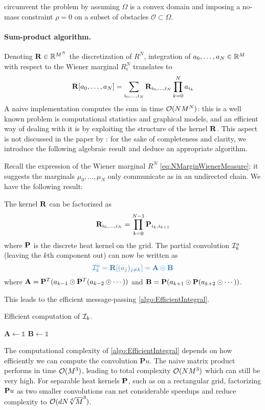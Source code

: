 \documentclass[../report.tex]{subfiles}
\begin{document}
\textcite{benamou:hal-01295299} circumvent the problem by assuming $\Omega$ is a convex domain and imposing a no-mass constraint $\rho = 0$ on a subset of obstacles $\mathscr{O} \subset \Omega$.

\paragraph{Sum-product algorithm.} Denoting $\mathbf{R} \in \mathbb{R}^{M^N}$ the discretization of $R^N$, integration of $a_0,\ldots,a_N\in\mathbb{R}^M$ with respect to the Wiener marginal $R^N_\epsilon$ translates to
\[
	\mathbf{R}[a_0, \ldots, a_N] =
	\sum_{i_0,\ldots,i_N} \mathbf{R}_{i_0,\ldots,i_N}\prod_{k=0}^N a_{i_k}
\]
A naive implementation computes the sum in time $\mathcal{O}(NM^N)$: this is a well known problem is computational statistics and graphical models, and an efficient way of dealing with it is by exploiting the structure of the kernel $\mathbf{R}$. This aspect is not discussed in the paper by \textcite{benamou:hal-01295299}: for the sake of completeness and clarity, we introduce the following algebraic result and deduce an appropriate algorithm.

Recall the expression of the Wiener marginal $R^N$ \cref{eq:NMarginWienerMeasure}: it suggests the marginals $\mu_0,\ldots,\mu_N$ only communicate as in an undirected chain. We have the following result:
\begin{prop}\label{prop:efficientConvol}
	The kernel $\mathbf{R}$ can be factorized as 
	\[
		\mathbf{R}_{i_0,\ldots,i_N} = \prod_{k=0}^{N-1} \mathbf{P}_{i_k,i_{k+1}}
	\]
	where $\mathbf{P}$ is the discrete heat kernel on the grid. The partial convolution $\mathcal{I}^a_k$ (leaving the $k$th component out) can now be written as
	\begin{equation}
	{\bluefont
		\calI_k^a = \bfR[(a_j)_{j\neq k}] =
		\mathbf{A} \odot \mathbf{B}
	}
	\end{equation}
	where $\mathbf{A} = \mathbf{P}^T (a_{k-1} \odot \mathbf{P}^T(a_{k-2} \odot \cdots))$ and $\mathbf{B} = \mathbf{P} (a_{k+1} \odot \mathbf{P} (a_{k+2}\odot \cdots))$.
\end{prop} This leads to the efficient message-passing \cref{algo:EfficientIntegral}.
\begin{algorithm}[h]
\caption{Efficient computation of $\mathcal{I}_k$.}\label{algo:EfficientIntegral}
$\mathbf{A} \leftarrow \mathds{1}$\;
$\mathbf{B} \leftarrow \mathds{1}$\;
\;
\end{algorithm}

The computational complexity of \cref{algo:EfficientIntegral} depends on how efficiently we can compute the convolution $\mathbf{P}u$. The naive matrix product performs in time $\mathcal{O}(M^3)$, leading to total complexity $\mathcal{O}(NM^3)$ which can still be very high. For separable heat kernels $\mathbf{P}$, such as on a rectangular grid, factorizing $\mathbf{P} u$ as two smaller convolutions can net considerable speedups \parencite[see][p.~74]{peyr2018computational} and reduce complexity to $\mathcal{O}(dN\sqrt[d]{M}^3)$.
\end{document}
